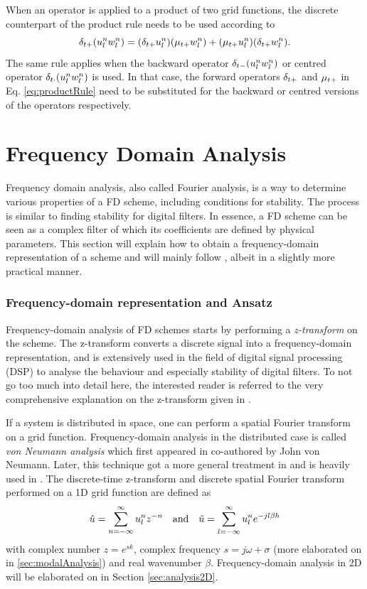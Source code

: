 When an operator is applied to a product of two grid functions, the discrete counterpart of the product rule needs to be used according to
\begin{equation}\label{eq:productRule}
    \delta_{t+} (u_l^nw_l^n) = (\delta_{t+} u_l^n)(\mu_{t+}w_l^n) + (\mu_{t+} u_l^n)(\delta_{t+} w_l^n).
\end{equation}
The same rule applies when the backward operator $\delta_{t-}(u_l^nw_l^n)$ or centred operator $\delta_{t\cdot}(u_l^nw_l^n)$ is used. In that case, the forward operators $\delta_{t+}$ and $\mu_{t+}$ in Eq. \eqref{eq:productRule} need to be substituted for the backward or centred versions of the operators respectively. 

\section{Frequency Domain Analysis}\label{sec:stabilityAnalysis}
Frequency domain analysis, also called Fourier analysis, is a way to determine various properties of a FD scheme, including conditions for stability. The process is similar to finding stability for digital filters. In essence, a FD scheme can be seen as a complex filter of which its coefficients are defined by physical parameters. This section will explain how to obtain a frequency-domain representation of a scheme and will mainly follow \cite{theBible}, albeit in a slightly more practical manner.

\subsubsection{Frequency-domain representation and Ansatz}
Frequency-domain analysis of FD schemes starts by performing a \textit{z-transform} on the scheme. The z-transform converts a discrete signal into a frequency-domain representation, and is extensively used in the field of digital signal processing (DSP) to analyse the behaviour and especially stability of digital filters. To not go too much into detail here, the interested reader is referred to the very comprehensive explanation on the z-transform given in \cite[Ch. 5]{Park2010}. 

If a system is distributed in space, one can perform a spatial Fourier transform on a grid function. Frequency-domain analysis in the distributed case is called \textit{von Neumann analysis} which first appeared in \cite{vonNeumann} co-authored by John von Neumann. Later, this technique got a more general treatment in \cite{Strikwerda1989} and is heavily used in \cite{theBible}. The discrete-time z-transform and discrete spatial Fourier transform performed on a 1D grid function are defined as \cite{theBible}
\begin{equation}
    \hat u  = \sum_{n=-\infty}^\infty u_l^n z^{-n}\quad \text{and} \quad \tilde u = \sum_{l=-\infty}^\infty u_l^n e^{-jl\beta h}
\end{equation}
with complex number $z = e^{sk}$, complex frequency $s=j\omega + \sigma$ (more elaborated on in \ref{sec:modalAnalysis}) and real wavenumber $\beta$. Frequency-domain analysis in 2D will be elaborated on in Section \ref{sec:analysis2D}.

